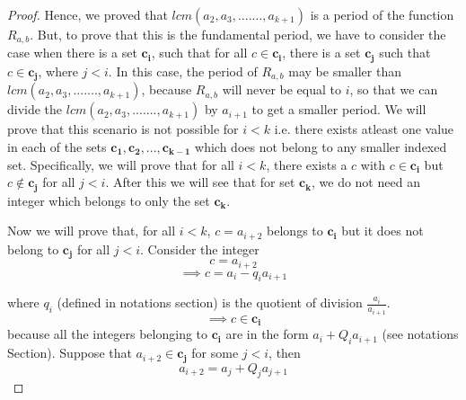 \documentclass[pdflatex,sn-mathphys-num]{sn-jnl}%
\theoremstyle{thmstyleone}%
\theoremstyle{thmstyletwo}%
\theoremstyle{thmstylethree}%
\begin{document}
\begin{proof}
\par Hence, we proved that $lcm(a_2,a_3,.......,a_{k+1})$ is a period of the function $R_{a,b}$. But, to prove that this is the fundamental period, we have to consider the case when there is a set $\mathbf{c_i}$, such that for all $c \in \mathbf{c_i}$, there is a set $\mathbf{c_j}$ such that $c \in \mathbf{c_j}$, where $j<i$. In this case, the period of $R_{a,b}$ may be smaller than $lcm(a_2,a_3,.......,a_{k+1})$, because $R_{a,b}$ will never be equal to $i$, so that we can divide the $lcm(a_2,a_3,.......,a_{k+1})$ by $a_{i+1}$ to get a smaller period. We will prove that this scenario is not possible for $i<k$ i.e. there exists atleast one value in each of the sets $\mathbf{c_1},\mathbf{c_2},..., \mathbf{c_{k-1}}$ which does not belong to any smaller indexed set. Specifically, we will prove that for all $i<k$, there exists a $c$ with $c \in \mathbf{c_i}$ but $c \notin \mathbf{c_j}$ for all $j<i$. After this we will see that for set $\mathbf{c_k}$, we do not need an integer which belongs to only the set $\mathbf{c_k}$.    
    \par  Now we will prove that, for all $i<k$, $c=a_{i+2}$ belongs to $\mathbf{c_i}$ but it does not belong to $\mathbf{c_j}$ for all $j<i$. Consider the integer $$c=a_{i+2}$$
$$\implies c = a_i-q_ia_{i+1}$$ 

where $q_i$ (defined in notations section) is the quotient of division $\frac{a_i}{a_{i+1}}$.
$$\implies c \in \mathbf{c_i}$$
because all the integers belonging to $\mathbf{c_i}$ are in the form $a_i+Q_ia_{i+1}$ (see notations Section).
Suppose that $a_{i+2} \in \mathbf{c_j}$ for some $j<i$, then 
\begin{equation}  \label{perEq1}
a_{i+2}=a_j+Q_{j}a_{j+1}    
\end{equation}





\end{proof}
\end{document}
